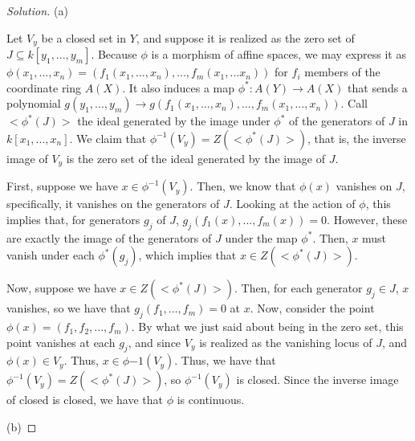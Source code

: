 \documentclass[10pt]{article}
\begin{document}
\begin{proof}[Solution]

(a)

Let $V_y$ be a closed set in $Y$, and suppose it is realized as the zero set of $J \subseteq k[y_1,...,y_m]$. Because $\phi$ is a morphism of affine spaces, we may express it as $\phi(x_1,...,x_n) = (f_1(x_1,...,x_n),...,f_m(x_1,...x_n))$ for $f_i$ members of the coordinate ring $A(X)$. It also induces a map $\phi^*: A(Y) \to A(X)$ that sends a polynomial $g(y_1,...,y_m) \to g(f_1(x_1,...,x_n),...,f_m(x_1,...,x_n))$. Call $<\phi^*(J)>$ the ideal generated by the image under $\phi^*$ of the generators of $J$ in $k[x_1,...,x_n]$. We claim that $\phi^{-1}(V_y) = Z(<\phi^*(J)>)$, that is, the inverse image of $V_y$ is the zero set of the ideal generated by the image of $J$.

First, suppose we have $x \in \phi^{-1}(V_y)$. Then, we know that $\phi(x)$ vanishes on $J$, specifically, it vanishes on the generators of $J$. Looking at the action of $\phi$, this implies that, for generators $g_j$ of $J$, $g_j(f_1(x),...,f_m(x)) = 0$. However, these are exactly the image of the generators of $J$ under the map $\phi^*$. Then, $x$ must vanish under each $\phi^*(g_j)$, which implies that $x \in  Z(<\phi^*(J)>)$.

Now, suppose we have $x \in Z(<\phi^*(J)>)$. Then, for each generator $g_j \in J$, $x$ vanishes, so we have that $g_j(f_1,...,f_m) = 0$ at $x$. Now, consider the point $\phi(x) = (f_1,f_2,...,f_m)$. By what we just said about being in the zero set, this point vanishes at each $g_j$, and since $V_y$ is realized as the vanishing locus of $J$, and $\phi(x) \in V_y$. Thus, $x \in \phi{-1}(V_y)$. Thus, we have that $\phi^{-1}(V_y) = Z(<\phi^*(J)>)$, so $\phi^{-1}(V_y)$ is closed. Since the inverse image of closed is closed, we have that $\phi$ is continuous.

(b)


\end{proof}
\end{document}
